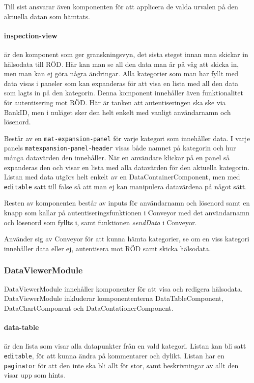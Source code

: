 \documentclass[techdoc/techdock.tex]{subfiles}
\begin{document}
Till sist ansvarar även komponenten för att applicera de valda urvalen på den 
aktuella datan som hämtats.

\paragraph{inspection-view} är den komponent som ger granskningsvyn, det sista
steget innan man skickar in hälsodata till RÖD. Här kan man se all den data man
är på väg att skicka in, men man kan ej göra några ändringar. Alla kategorier
som man har fyllt med data visas i paneler som kan expanderas för att visa en
lista med all den data som lagts in på den kategorin. Denna komponent
innehåller även funktionalitet för autentisering mot RÖD. Här är tanken att
autentiseringen ska ske via BankID, men i nuläget sker den helt enkelt med
vanligt användarnamn och lösenord.

Består av en \texttt{mat-expansion-panel} för varje kategori som innehåller
data. I varje panels \texttt{mat\-expansion-panel-header} visas både namnet på
kategorin och hur många datavärden den innehåller. När en användare klickar på
en panel så expanderas den och visar en lista med alla datavärden för den
aktuella kategorin. Listan med data utgörs helt enkelt av en
DataContainerComponent, men med \texttt{editable} satt till false så att man ej
kan manipulera datavärdena på något sätt.

Resten av komponenten består av inputs för användarnamn och lösenord samt en
knapp som kallar på autentiseringsfunktionen i Conveyor med det användarnamn
och lösenord som fyllts i, samt funktionen \textit{sendData} i Conveyor.

Använder sig av Conveyor för att kunna hämta kategorier, se om en viss kategori
innehåller data eller ej, autentisera mot RÖD samt skicka hälsodata.

\subsubsection{DataViewerModule}
DataViewerModule innehåller komponenter för att visa och redigera hälsodata.
DataViewerModule inkluderar komponententerna DataTableComponent,
DataChartComponent och DataContationerComponent.

\paragraph{data-table} är den lista som visar alla datapunkter från en vald
kategori. Listan kan bli satt \texttt{editable}, för att kunna ändra på
kommentarer och dylikt.  Listan har en \texttt{paginator} för att den inte ska
bli allt för stor, samt beskrivningar av allt den visar upp som hints.
\end{document}
